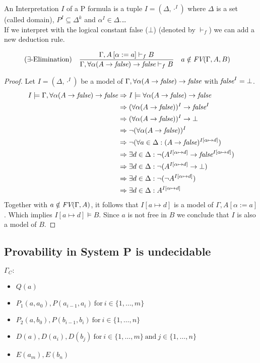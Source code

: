 An Interpretation $I$ of a P formula is a tuple $I=(\Delta,\cdot^I)$ where $\Delta$ is a set (called domain), $P^I\subseteq\Delta^k$ and $\alpha^I\in\Delta$.\dots\\
If we interpret \false{} with the logical constant false ($\bot$) (denoted by $\vdash_f$) we can add a new deduction rule.
\begin{mdframed}
\begin{align*}
&(\exists\text{-Elimination}) &&\frac
{\Gamma,A\left[\alpha:=a\right]\vdash_f B}
{\Gamma,\forall\alpha(A\to\emph{false})\to\emph{false}\vdash_f B} && a\notin\emph{FV}(\Gamma,A,B)
\end{align*}
\end{mdframed}
\begin{proof}
Let $I=(\Delta,\cdot^I)$ be a model of $\Gamma,\forall\alpha(A\to\emph{false})\to\emph{false}$ with $\emph{false}^I=\bot$.
\begin{align*}
I\models\Gamma,\forall\alpha(A\to\emph{false})\to\emph{false}&\Rightarrow I\models\forall\alpha(A\to\emph{false})\to\emph{false}\\
&\Rightarrow (\forall\alpha(A\to\emph{false}))^I\to\emph{false}^I\\
&\Rightarrow (\forall\alpha(A\to\emph{false}))^I\to\bot\\
&\Rightarrow \neg(\forall\alpha(A\to\emph{false}))^I\\
&\Rightarrow \neg(\forall a\in\Delta:(A\to\emph{false})^{I\left[\alpha\mapsto d\right]})\\
&\Rightarrow \exists d\in\Delta:\neg(A^{I\left[\alpha\mapsto d\right]}\to\emph{false}^{I\left[\alpha\mapsto d\right]})\\
&\Rightarrow \exists d\in\Delta:\neg(A^{I\left[\alpha\mapsto d\right]}\to\bot)\\
&\Rightarrow \exists d\in\Delta:\neg(\neg A^{I\left[\alpha\mapsto d\right]})\\
&\Rightarrow \exists d\in\Delta:A^{I\left[\alpha\mapsto d\right]}\\
\end{align*}
Together with $a\notin\emph{FV}(\Gamma,A)$, it follows that $I\left[a\mapsto d\right]$ is a model of $\Gamma,A\left[\alpha:=a\right]$. Which implies $I\left[a\mapsto d\right]\models B$.	Since $a$ is not free in $B$ we conclude that $I$ is also a model of $B$.
\end{proof}
\subsection{Provability in System P is undecidable}
$\Gamma_C:$
\begin{itemize}
\item $Q(a)$
\item $P_1(a,a_0),P(a_{i-1},a_i)~\text{for}~i\in\{1,\dots,m\}$
\item $P_2(a,b_0),P(b_{i-1},b_i)~\text{for}~i\in\{1,\dots,n\}$
\item $D(a),D(a_i),D(b_j)~\text{for}~i\in\{1,\dots,m\}~\text{and}~j\in\{1,\dots,n\}$
\item $E(a_m),E(b_n)$
\end{itemize}

